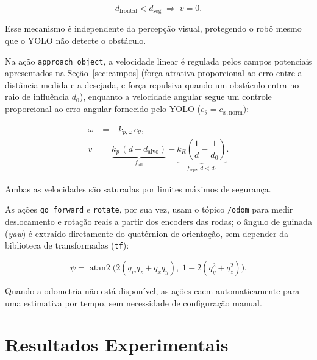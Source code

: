 \begin{equation}
  \label{eq:freio}
  d_{\text{frontal}} < d_{\text{seg}} \;\Rightarrow\; v = 0 .
\end{equation}

Esse mecanismo é independente da percepção visual, protegendo o robô mesmo que o
YOLO não detecte o obstáculo.

Na ação \texttt{approach\_object}, a velocidade linear é regulada pelos campos
potenciais apresentados na Seção~\ref{sec:campos} (força atrativa proporcional ao
erro entre a distância medida e a desejada, e força repulsiva quando um obstáculo
entra no raio de influência $d_0$), enquanto a velocidade angular segue um
controle proporcional ao erro angular fornecido pelo YOLO
($e_\theta = c_{x,\text{norm}}$):

\begin{equation}
  \label{eq:aproximacao}
  \begin{aligned}
    \omega &= -k_{p,\omega}\, e_\theta, \\[1.5ex]
    v &= \underbrace{k_{p}\,(d - d_{\text{alvo}})}_{f_{\text{att}}}
       - \underbrace{k_{R}\!\left(\dfrac{1}{d} - \dfrac{1}{d_0}\right)}_{f_{\text{rep}},\; d < d_0} .
  \end{aligned}
\end{equation}

Ambas as velocidades são saturadas por limites máximos de segurança.

As ações \texttt{go\_forward} e \texttt{rotate}, por sua vez, usam o tópico
\texttt{/odom} para medir deslocamento e rotação reais a partir dos encoders das
rodas; o ângulo de guinada (\textit{yaw}) é extraído diretamente do quatérnion de
orientação, sem depender da biblioteca de transformadas (\texttt{tf}):

\begin{equation}
  \label{eq:yaw}
  \psi = \operatorname{atan2}\!\big(2(q_w q_z + q_x q_y),\; 1 - 2(q_y^2 + q_z^2)\big) .
\end{equation}

Quando a odometria não está disponível, as ações caem automaticamente para uma
estimativa por tempo, sem necessidade de configuração manual.


\newpage
\section{Resultados Experimentais}

